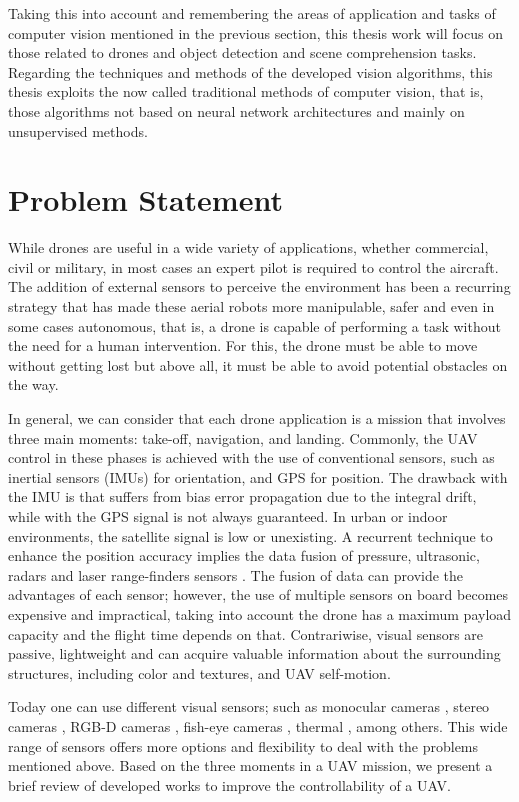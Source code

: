 Taking this into account and remembering the areas of application and tasks of computer vision mentioned in the previous section, this thesis work will focus on those related to drones and object detection and scene comprehension tasks. Regarding the techniques and methods of the developed vision algorithms, this thesis exploits the now called traditional methods of computer vision, that is, those algorithms not based on neural network architectures and mainly on unsupervised methods.

\section{Problem Statement}

While drones are useful in a wide variety of applications, whether commercial, civil or military, in most cases an expert pilot is required to control the aircraft. The addition of external sensors to perceive the environment has been a recurring strategy that has made these aerial robots more manipulable, safer and even in some cases autonomous, that is, a drone is capable of performing a task without the need for a human intervention. For this, the drone must be able to move without getting lost but above all, it must be able to avoid potential obstacles on the way.

In general, we can consider that each drone application is a mission that involves three main moments: take-off, navigation, and landing. Commonly, the UAV  control in these phases is achieved with the use of conventional sensors, such as inertial sensors (IMUs) for orientation, and GPS for position. The drawback with the IMU is that suffers from bias error propagation due to the integral drift, while with the GPS signal is not always guaranteed. In urban or indoor environments, the satellite signal is low or unexisting. A recurrent technique to enhance the position accuracy implies the data fusion of pressure, ultrasonic, radars and laser range-finders sensors \cite{Tomic.Schmid.ea:IRAM:2012}. The fusion of data can provide the advantages of each sensor; however, the use of multiple sensors on board becomes expensive and impractical, taking into account the drone has a maximum payload capacity and the flight time depends on that. Contrariwise, visual sensors are passive, lightweight and can acquire valuable information about the surrounding structures, including color and textures, and UAV self-motion. 

Today one can use different visual sensors; such as monocular cameras \cite{Padhy.Xia.ea:TSC:2018}, stereo cameras \cite{Seitz.Curless.ea:CVPR:2006}, RGB-D cameras \cite{Huang.Bachrach.ea:RobR:2017}, fish-eye cameras \cite{Hrabar.Sukhatme:IROS:2004}, thermal \cite{Gaszczak.Breckon.ea:IRCV:2011}, among others. This wide range of sensors offers more options and flexibility to deal with the problems mentioned above. Based on the three moments in a UAV mission, we present a brief review of developed works to improve the controllability of a UAV. 

